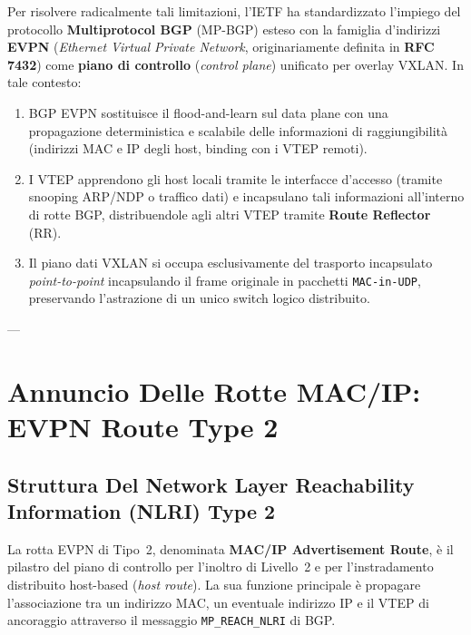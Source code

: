 \documentclass[11pt, a4paper]{article}
\begin{document}
Per risolvere radicalmente tali limitazioni, l'IETF ha standardizzato l'impiego del protocollo \textbf{Multiprotocol BGP} (MP-BGP) esteso con la famiglia d'indirizzi \textbf{EVPN} (\emph{Ethernet Virtual Private Network}, originariamente definita in \textbf{RFC 7432}) come \textbf{piano di controllo} (\emph{control plane}) unificato per overlay VXLAN. In tale contesto:
\begin{enumerate}[noitemsep]
    \item BGP EVPN sostituisce il flood-and-learn sul data plane con una propagazione deterministica e scalabile delle informazioni di raggiungibilità (indirizzi MAC e IP degli host, binding con i VTEP remoti).
    \item I VTEP apprendono gli host locali tramite le interfacce d'accesso (tramite snooping ARP/NDP o traffico dati) e incapsulano tali informazioni all'interno di rotte BGP, distribuendole agli altri VTEP tramite \textbf{Route Reflector} (RR).
    \item Il piano dati VXLAN si occupa esclusivamente del trasporto incapsulato \emph{point-to-point} incapsulando il frame originale in pacchetti \texttt{MAC-in-UDP}, preservando l'astrazione di un unico switch logico distribuito.
\end{enumerate}


---

\section{Annuncio Delle Rotte MAC/IP: EVPN Route Type 2}

\subsection{Struttura Del Network Layer Reachability Information (NLRI) Type 2}

La rotta EVPN di Tipo~2, denominata \textbf{MAC/IP Advertisement Route}, è il pilastro del piano di controllo per l'inoltro di Livello~2 e per l'instradamento distribuito host-based (\emph{host route}). La sua funzione principale è propagare l'associazione tra un indirizzo MAC, un eventuale indirizzo IP e il VTEP di ancoraggio attraverso il messaggio \texttt{MP\_REACH\_NLRI} di BGP.
\end{document}
